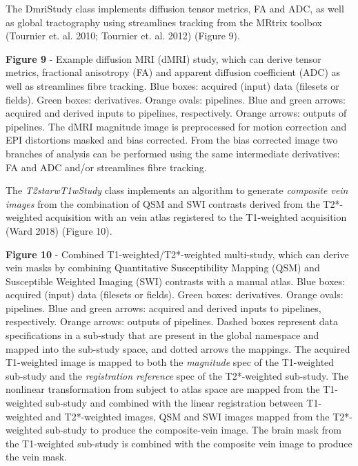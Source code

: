 The DmriStudy class implements diffusion tensor metrics, FA and ADC, as
well as global tractography using streamlines tracking from the MRtrix
toolbox (Tournier et. al. 2010; Tournier et. al. 2012) (Figure 9).


\textbf{Figure 9} - Example diffusion MRI (dMRI) study, which can derive
tensor metrics, fractional anisotropy (FA) and apparent diffusion
coefficient (ADC) as well as streamlines fibre tracking. Blue boxes:
acquired (input) data (filesets or fields). Green boxes: derivatives.
Orange ovals: pipelines. Blue and green arrows: acquired and derived
inputs to pipelines, respectively. Orange arrows: outputs of pipelines.
The dMRI magnitude image is preprocessed for motion correction and EPI
distortions masked and bias corrected. From the bias corrected image two
branches of analysis can be performed using the same intermediate
derivatives: FA and ADC and/or streamlines fibre tracking.

The \emph{T2starwT1wStudy} class implements an algorithm to generate
\emph{composite vein images} from the combination of QSM and SWI
contrasts derived from the T2*-weighted acquisition with an vein atlas
registered to the T1-weighted acquisition (Ward 2018) (Figure 10).


\textbf{Figure 10} - Combined T1-weighted/T2*-weighted multi-study,
which can derive vein masks by combining Quantitative Susceptibility
Mapping (QSM) and Susceptible Weighted Imaging (SWI) contrasts with a
manual atlas. Blue boxes: acquired (input) data (filesets or fields).
Green boxes: derivatives. Orange ovals: pipelines. Blue and green
arrows: acquired and derived inputs to pipelines, respectively. Orange
arrows: outputs of pipelines. Dashed boxes represent data specifications
in a sub-study that are present in the global namespace and mapped into
the sub-study space, and dotted arrows the mappings. The acquired
T1-weighted image is mapped to both the \emph{magnitude} spec of the
T1-weighted sub-study and the \emph{registration reference} spec of the
T2*-weighted sub-study. The nonlinear transformation from subject to
atlas space are mapped from the T1-weighted sub-study and combined with
the linear registration between T1-weighted and T2*-weighted images, QSM
and SWI images mapped from the T2*-weighted sub-study to produce the
composite-vein image. The brain mask from the T1-weighted sub-study is
combined with the composite vein image to produce the vein mask.

